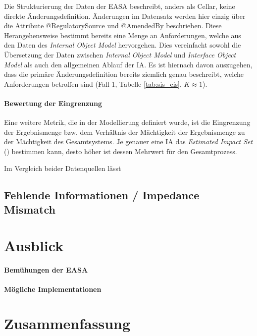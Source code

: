 \medskip
Die Strukturierung der Daten der \ac{EASA} beschreibt, anders als Cellar, keine direkte Änderungsdefinition.
Änderungen im Datensatz werden hier einzig über die Attribute @RegulatorySource und @AmendedBy beschrieben.
Diese Herangehensweise bestimmt bereits eine Menge an Anforderungen, welche aus den Daten des \textit{Internal Object Model} hervorgehen.
Dies vereinfacht sowohl die Übersetzung der Daten zwischen \textit{Internal Object Model} und \textit{Interface Object Model} als auch den allgemeinen Ablauf der \ac{IA}.
Es ist hiernach davon auszugehen, dass die primäre Änderungsdefinition bereits ziemlich genau beschreibt, welche Anforderungen betroffen sind (Fall 1, Tabelle \ref{tab:sis_eis}, $K \approx  1$).

\subsubsection{Bewertung der Eingrenzung}

Eine weitere Metrik, die in der Modellierung definiert wurde, ist die Eingrenzung der Ergebnismenge bzw. dem Verhältnis der Mächtigkeit der Ergebnismenge zu der Mächtigkeit des Gesamtsystems.
Je genauer eine \ac{IA} das \textit{Estimated Impact Set} () bestimmen kann, desto höher ist dessen Mehrwert für den Gesamtprozess.

\medskip
Im Vergleich beider Datenquellen lässt 


    
    \section{Fehlende Informationen / Impedance Mismatch}

\chapter{Ausblick}\label{ch:ausblick}
    
    \subsubsection{Bemühungen der EASA}
    
    \subsubsection{Mögliche Implementationen}
    
\chapter{Zusammenfassung}


